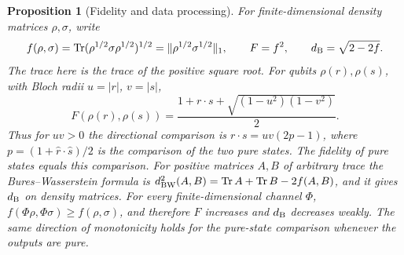 \documentclass[aps,pra,onecolumn,superscriptaddress,nofootinbib,10pt]{revtex4-2}
\newtheorem{proposition}[theorem]{Proposition}
\theoremstyle{definition}
\theoremstyle{remark}
\newcommand{\tr}{\operatorname{Tr}}
\begin{document}
\begin{proposition}[Fidelity and data processing]\label{ob:fidelity}
For finite-dimensional density matrices \(\rho,\sigma\), write
\[
 f(\rho,\sigma)=\tr(\rho^{1/2}\sigma\rho^{1/2})^{1/2}
 =\|\rho^{1/2}\sigma^{1/2}\|_1,\qquad F=f^2,\qquad
 d_{\rm B}=\sqrt{2-2f}.
\]
The trace here is the trace of the positive square root. For qubits
\(\rho(r),\rho(s)\), with Bloch radii \(u=|r|\), \(v=|s|\),
\[
 F(\rho(r),\rho(s))=
 \frac{1+r\cdot s+\sqrt{(1-u^2)(1-v^2)}}2 .
\]
Thus for \(uv>0\) the directional comparison is \(r\cdot s=uv(2p-1)\),
where \(p=(1+\widehat r\cdot\widehat s)/2\) is the comparison of the two
pure states. The fidelity of pure states equals this comparison. For
positive matrices \(A,B\) of arbitrary trace the Bures--Wasserstein
formula is \(d_{\rm BW}^2(A,B)=\tr A+\tr B-2f(A,B)\), and it gives
\(d_{\rm B}\) on density matrices. For every finite-dimensional channel
\(\Phi\), \(f(\Phi\rho,\Phi\sigma)\ge f(\rho,\sigma)\), and therefore
\(F\) increases and \(d_{\rm B}\) decreases weakly. The same direction of
monotonicity holds for the pure-state comparison whenever the outputs
are pure.
\end{proposition}
\end{document}
